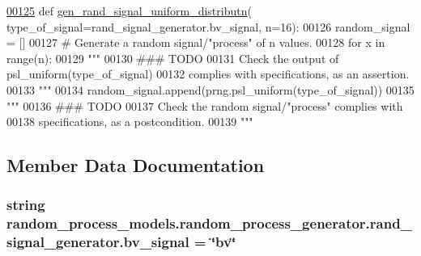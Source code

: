 \begin{DoxyCode}
\hypertarget{classrandom__process__models_1_1random__process__generator_1_1rand__signal__generator_l00125}{}\hyperlink{classrandom__process__models_1_1random__process__generator_1_1rand__signal__generator_a0120f8a5803679907bca0d8267e30781}{00125}     \textcolor{keyword}{def }\hyperlink{classrandom__process__models_1_1random__process__generator_1_1rand__signal__generator_a0120f8a5803679907bca0d8267e30781}{gen\_rand\_signal\_uniform\_distributn}(
      type\_of\_signal=rand\_signal\_generator.bv\_signal, n=16):
00126         random\_signal = []
00127         \textcolor{comment}{# Generate a random signal/"process" of n values.}
00128         \textcolor{keywordflow}{for} x \textcolor{keywordflow}{in} range(n):
00129             \textcolor{stringliteral}{"""}
00130 \textcolor{stringliteral}{                ### TODO}
00131 \textcolor{stringliteral}{                Check the output of psl\_uniform(type\_of\_signal)}
00132 \textcolor{stringliteral}{                    complies with specifications, as an assertion.}
00133 \textcolor{stringliteral}{            """}
00134             random\_signal.append(prng.psl\_uniform(type\_of\_signal))
00135         \textcolor{stringliteral}{"""}
00136 \textcolor{stringliteral}{            ### TODO}
00137 \textcolor{stringliteral}{            Check the random signal/"process" complies with}
00138 \textcolor{stringliteral}{                specifications, as a postcondition.}
00139 \textcolor{stringliteral}{        """}
\end{DoxyCode}


\subsection{Member Data Documentation}
\hypertarget{classrandom__process__models_1_1random__process__generator_1_1rand__signal__generator_ab5e9d283e3d5d2a2c6ba58897d208547}{}
\subsubsection[{bv\+\_\+signal}]{\setlength{\rightskip}{0pt plus 5cm}string random\+\_\+process\+\_\+models.\+random\+\_\+process\+\_\+generator.\+rand\+\_\+signal\+\_\+generator.\+bv\+\_\+signal = \char`\"{}bv\char`\"{}\hspace{0.3cm}{\ttfamily [static]}}\label{classrandom__process__models_1_1random__process__generator_1_1rand__signal__generator_ab5e9d283e3d5d2a2c6ba58897d208547}


